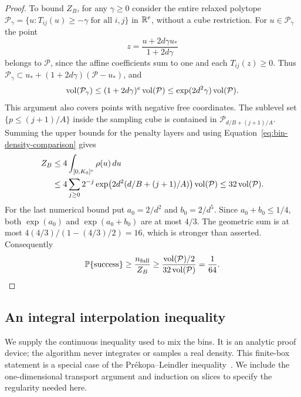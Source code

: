 \begin{proof}
To bound $Z_B$, for any $\gamma\ge0$ consider the entire relaxed
polytope $\mathcal P_\gamma=\{u:T_{ij}(u)\ge-\gamma\text{ for all }i,j\}$
in $\mathbb{R}^e$, without a cube restriction.  For $u\in\mathcal P_\gamma$ the
point
\[
 z=\frac{u+2d\gamma u_*}{1+2d\gamma}
\]
belongs to $\mathcal P$, since the affine coefficients sum to one and
each $T_{ij}(z)\ge0$.  Thus
$\mathcal P_\gamma\subset
u_*+(1+2d\gamma)(\mathcal P-u_*)$, and
\begin{equation}\label{eq:dense-relaxed-volume}
 \operatorname{vol}(\mathcal P_\gamma)
 \le(1+2d\gamma)^e\operatorname{vol}(\mathcal P)
 \le\exp(2d^2\gamma)\operatorname{vol}(\mathcal P).
\end{equation}
This argument also covers points with negative free coordinates.
The sublevel set $\{p\le(j+1)/A\}$ inside the sampling cube is contained
in $\mathcal P_{d/B+(j+1)/A}$.  Summing the upper bounds for the penalty
layers and using Equation~\eqref{eq:bin-density-comparison} gives
\begin{align*}
 Z_B&\le4\int_{[0,K_0]^e}\rho(u)\,du\\
 &\le4\sum_{j\ge0}2^{-j}
       \exp\bigl(2d^2(d/B+(j+1)/A)\bigr)\operatorname{vol}(\mathcal P)
 \le32\operatorname{vol}(\mathcal P).
\end{align*}
For the last numerical bound put $a_0=2/d^2$ and $b_0=2/d^5$.
Since $a_0+b_0\le1/4$, both $\exp(a_0)$ and
$\exp(a_0+b_0)$ are at most $4/3$.  The geometric sum is at most
$4(4/3)/(1-(4/3)/2)=16$, which is stronger than asserted.
Consequently
\[
 \mathbb{P}\{\text{success}\}\ge\frac{n_{\rm full}}{Z_B}
 \ge\frac{\operatorname{vol}(\mathcal P)/2}{32\operatorname{vol}(\mathcal P)}=\frac1{64}.
\]
\end{proof}

\subsection{An integral interpolation inequality}

We supply the continuous inequality used to mix the bins.  It is an
analytic proof device; the algorithm never integrates or samples a real
density. This finite-box statement is a special case of the
Pr\'ekopa--Leindler inequality~\cite{Leindler1972,Prekopa1973}. We include
the one-dimensional transport argument and induction on slices to specify
the regularity needed here.

